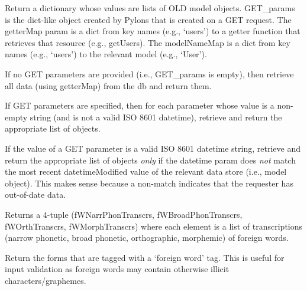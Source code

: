 \documentclass[letterpaper,10pt,english]{sphinxmanual}
\begin{document}
\begin{fulllineitems}
\label{api:old.lib.utils.getDataForNewAction}
Return a dictionary whose values are lists of OLD model objects.
GET\_params is the dict-like object created by Pylons that is created on a
GET request.  The getterMap param is a dict from key names (e.g., `users')
to a getter function that retrieves that resource (e.g., getUsers).  The
modelNameMap is a dict from key names (e.g., `users') to the relevant model
(e.g., `User').

If no GET parameters are provided (i.e., GET\_params is empty), then retrieve
all data (using getterMap) from the db and return them.

If GET parameters are specified, then for each parameter whose value is a
non-empty string (and is not a valid ISO 8601 datetime), retrieve and
return the appropriate list of objects.

If the value of a GET parameter is a valid ISO 8601 datetime string,
retrieve and return the appropriate list of objects \emph{only} if the
datetime param does \emph{not} match the most recent datetimeModified value
of the relevant data store (i.e., model object).  This makes sense because a
non-match indicates that the requester has out-of-date data.

\end{fulllineitems}


\begin{fulllineitems}
\label{api:old.lib.utils.getForeignWordTranscriptions}
Returns a 4-tuple (fWNarrPhonTranscrs, fWBroadPhonTranscrs,
fWOrthTranscrs, fWMorphTranscrs) where each element is a list of
transcriptions (narrow phonetic, broad phonetic, orthographic, morphemic)
of foreign words.

\end{fulllineitems}


\begin{fulllineitems}
\label{api:old.lib.utils.getForeignWords}
Return the forms that are tagged with a `foreign word' tag.  This is
useful for input validation as foreign words may contain otherwise illicit
characters/graphemes.

\end{fulllineitems}
\end{document}

